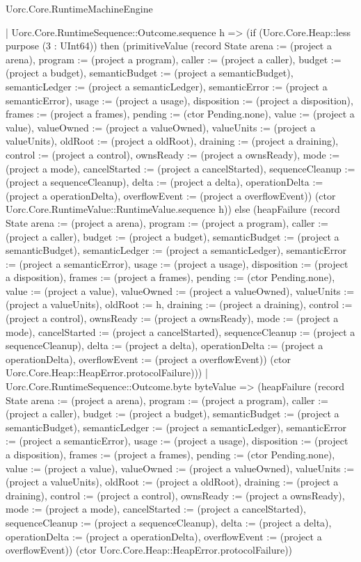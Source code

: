\begin{lexlean}{Uorc.Core.RuntimeMachineEngine}
\begin{semanticmodule}
{    | Uorc.Core.RuntimeSequence::Outcome.sequence h => (if (Uorc.Core.Heap::less purpose (3 : UInt64)) then (primitiveValue (record State {arena := (project a arena), program := (project a program), caller := (project a caller), budget := (project a budget), semanticBudget := (project a semanticBudget), semanticLedger := (project a semanticLedger), semanticError := (project a semanticError), usage := (project a usage), disposition := (project a disposition), frames := (project a frames), pending := (ctor Pending.none), value := (project a value), valueOwned := (project a valueOwned), valueUnits := (project a valueUnits), oldRoot := (project a oldRoot), draining := (project a draining), control := (project a control), ownsReady := (project a ownsReady), mode := (project a mode), cancelStarted := (project a cancelStarted), sequenceCleanup := (project a sequenceCleanup), delta := (project a delta), operationDelta := (project a operationDelta), overflowEvent := (project a overflowEvent)}) (ctor Uorc.Core.RuntimeValue::RuntimeValue.sequence h)) else (heapFailure (record State {arena := (project a arena), program := (project a program), caller := (project a caller), budget := (project a budget), semanticBudget := (project a semanticBudget), semanticLedger := (project a semanticLedger), semanticError := (project a semanticError), usage := (project a usage), disposition := (project a disposition), frames := (project a frames), pending := (ctor Pending.none), value := (project a value), valueOwned := (project a valueOwned), valueUnits := (project a valueUnits), oldRoot := h, draining := (project a draining), control := (project a control), ownsReady := (project a ownsReady), mode := (project a mode), cancelStarted := (project a cancelStarted), sequenceCleanup := (project a sequenceCleanup), delta := (project a delta), operationDelta := (project a operationDelta), overflowEvent := (project a overflowEvent)}) (ctor Uorc.Core.Heap::HeapError.protocolFailure)))
    | Uorc.Core.RuntimeSequence::Outcome.byte byteValue => (heapFailure (record State {arena := (project a arena), program := (project a program), caller := (project a caller), budget := (project a budget), semanticBudget := (project a semanticBudget), semanticLedger := (project a semanticLedger), semanticError := (project a semanticError), usage := (project a usage), disposition := (project a disposition), frames := (project a frames), pending := (ctor Pending.none), value := (project a value), valueOwned := (project a valueOwned), valueUnits := (project a valueUnits), oldRoot := (project a oldRoot), draining := (project a draining), control := (project a control), ownsReady := (project a ownsReady), mode := (project a mode), cancelStarted := (project a cancelStarted), sequenceCleanup := (project a sequenceCleanup), delta := (project a delta), operationDelta := (project a operationDelta), overflowEvent := (project a overflowEvent)}) (ctor Uorc.Core.Heap::HeapError.protocolFailure))
}
\end{semanticmodule}
\end{lexlean}
